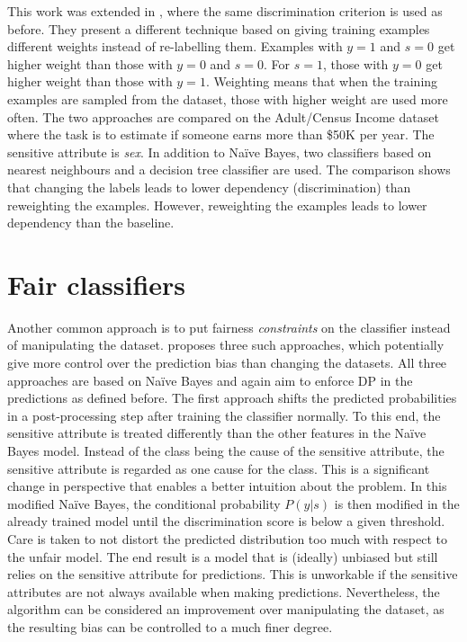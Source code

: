 This work was extended in \citet{calders2009building},
where the same discrimination criterion is used as before.
They present a different technique based on giving training examples different weights
instead of re-labelling them.
Examples with \(y=1\) and \(s=0\) get higher weight than those with \(y=0\) and \(s=0\).
For \(s=1\), those with \(y=0\) get higher weight than those with \(y=1\).
Weighting means that when the training examples are sampled from the dataset,
those with higher weight are used more often.
The two approaches are compared on the Adult/Census Income dataset \citep{kohavi1996scaling}
where the task is to estimate if someone earns more than \$50K per year.
The sensitive attribute is \emph{sex}.
In addition to Na\"ive Bayes,
two classifiers based on nearest neighbours and a decision tree classifier are used.
The comparison shows that changing the labels leads to lower dependency (discrimination)
than reweighting the examples.
However, reweighting the examples leads to lower dependency than the baseline.

\section{Fair classifiers}\label{fair-classifiers}
Another common approach is to put fairness \emph{constraints} on the classifier
instead of manipulating the dataset.
\citet{calders2010three} proposes three such approaches,
which potentially give more control over the prediction bias than changing the datasets.
All three approaches are based on Na\"ive Bayes
and again aim to enforce \ac{DP} in the predictions as defined before.
The first approach shifts the predicted probabilities in a post-processing step
after training the classifier normally.
To this end, the sensitive attribute is treated differently
than the other features in the Na\"ive Bayes model.
Instead of the class being the cause of the sensitive attribute,
the sensitive attribute is regarded as one cause for the class.
This is a significant change in perspective that enables a better intuition about the problem.
In this modified Na\"ive Bayes,
the conditional probability \(P(y|s)\) is then modified in the already trained model
until the discrimination score is below a given threshold.
Care is taken to not distort the predicted distribution too much with respect to the unfair model.
The end result is a model that is (ideally) unbiased
but still relies on the sensitive attribute for predictions.
This is unworkable if the sensitive attributes are not always available when making predictions.
Nevertheless, the algorithm can be considered an improvement over manipulating the dataset,
as the resulting bias can be controlled to a much finer degree.

